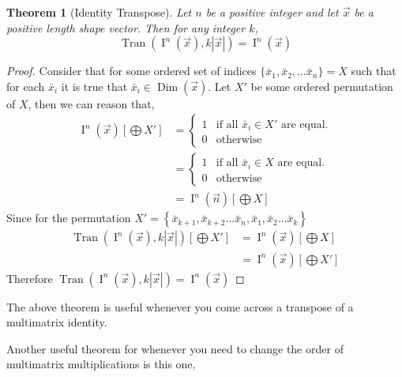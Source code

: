 \documentclass[12pt]{book}
\theoremstyle{plain}
\newtheorem{theorem}{Theorem}[chapter]
\theoremstyle{definition}
\theoremstyle{ppart}
\theoremstyle{case}
\theoremstyle{solution}
\DeclareMathOperator{\Dim}{Dim}
\DeclareMathOperator{\Ident}{I}
\DeclareMathOperator{\Tran}{Tran}
\newcommand{\shape}[1]{\left|#1\right|}
\begin{document}
\begin{theorem}[Identity Transpose]
Let $n$ be a positive integer and let $\vec{x}$ be a positive length
shape vector. Then for any integer $k$,
\[ \Tran(\Ident^n(\vec{x}), k\shape{\vec{x}}) = \Ident^n(\vec{x}) \]
\end{theorem}
\begin{proof}
Consider that for some ordered set of indices
$\{\bar{x}_1, \bar{x}_2, \ldots \bar{x}_n\} = X$ such that for each
$\bar{x}_i$ it is true that $\bar{x}_i \in \Dim(\vec{x})$.
Let $X'$ be some ordered permutation of $X$, then we can reason that,
\begin{align*}
 \Ident^n(\vec{x})\left[\bigoplus X'\right]
 &= 
	\left\{
  \begin{array}{ll}
    1 & \mbox{if all } \bar{x}_i \in X' \mbox{ are equal.}\\
    0 & \mbox{otherwise}
  \end{array}
	\right.\\
 &= 
	\left\{
  \begin{array}{ll}
    1 & \mbox{if all } \bar{x}_i \in X \mbox{ are equal.}\\
    0 & \mbox{otherwise}
  \end{array}
	\right.\\
 &=\Ident^n(\vec{n})\left[\bigoplus X\right]
\end{align*}
Since for the permutation
$X' = \left\{\bar{x}_{k+1}, \bar{x}_{k+2} \ldots \bar{x}_{n},
\bar{x}_1, \bar{x}_2 \ldots \bar{x}_k\right\}$
\begin{align*}
  \Tran(\Ident^n(\vec{x}), k\shape{\vec{x}})\left[\bigoplus X'\right]
	&=
  \Ident^n(\vec{x})\left[\bigoplus X\right]\\
	&=
  \Ident^n(\vec{x})\left[\bigoplus X'\right]
\end{align*}
Therefore
$\Tran(\Ident^n(\vec{x}), k\shape{\vec{x}}) = \Ident^n(\vec{x})$
\end{proof}

The above theorem is useful whenever you come across a transpose of a
multimatrix identity.

Another useful theorem for whenever you need to change the order of
multimatrix multiplications is this one,
\end{document}
